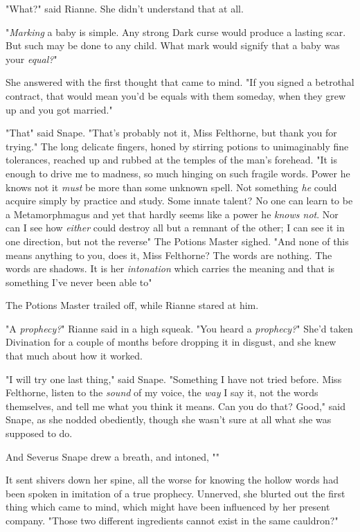 "What?" said Rianne. She didn't understand that at all.

"\emph{Marking} a baby is simple. Any strong Dark curse would produce a lasting
scar. But such may be done to any child. What mark would signify that a baby
was your \emph{equal?}"

She answered with the first thought that came to mind. "If you signed a
betrothal contract, that would mean you'd be equals with them someday, when
they grew up and you got married."

"That{\el}" said Snape. "That's probably not it, Miss Felthorne, but thank
you for trying." The long delicate fingers, honed by stirring potions to
unimaginably fine tolerances, reached up and rubbed at the temples of the man's
forehead. "It is enough to drive me to madness, so much hinging on such fragile
words. Power he knows not{\el} it \emph{must} be more than some unknown
spell. Not something \emph{he} could acquire simply by practice and study. Some
innate talent? No one can learn to be a Metamorphmagus{\el} and yet that
hardly seems like a power he \emph{knows not}. Nor can I see how \emph{either}
could destroy all but a remnant of the other; I can see it in one direction,
but not the reverse{\el}" The Potions Master sighed. "And none of this means
anything to you, does it, Miss Felthorne? The words are nothing. The words are
shadows. It is her \emph{intonation} which carries the meaning and that is
something I've never been able to{\el}"

The Potions Master trailed off, while Rianne stared at him.

"A \emph{prophecy?}" Rianne said in a high squeak. "You heard a
\emph{prophecy?}" She'd taken Divination for a couple of months before dropping
it in disgust, and she knew that much about how it worked.

"I will try one last thing," said Snape. "Something I have not tried before.
Miss Felthorne, listen to the \emph{sound} of my voice, the \emph{way} I say
it, not the words themselves, and tell me what you think it means. Can
you do that? Good," said Snape, as she nodded obediently, though she wasn't
sure at all what she was supposed to do.

And Severus Snape drew a breath, and intoned, ""

It sent shivers down her spine, all the worse for knowing the hollow words had
been spoken in imitation of a true prophecy. Unnerved, she blurted out the
first thing which came to mind, which might have been influenced by her present
company. "Those two different ingredients cannot exist in the same cauldron?"

